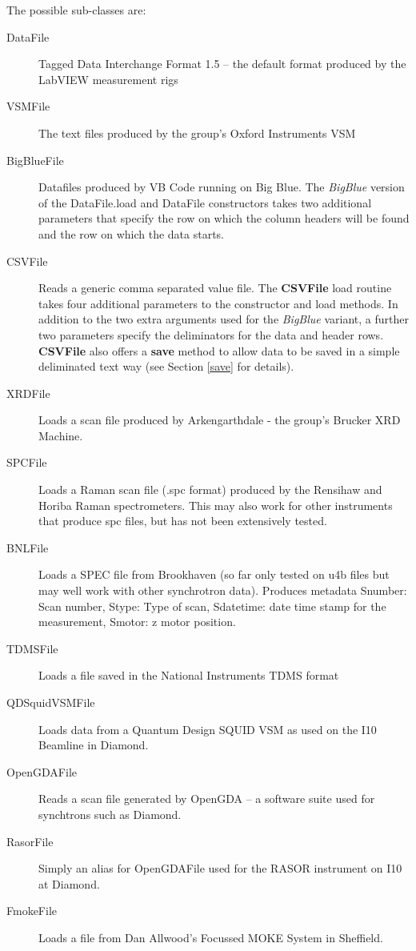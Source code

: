 \documentclass[a4paper,11pt]{scrartcl}
\begin{document}

The possible sub-classes are:
\begin{description}
\item[DataFile] Tagged Data Interchange Format 1.5 -- the default format produced by
the LabVIEW measurement rigs
\item[VSMFile] The text files produced by the group's Oxford Instruments VSM
\item[BigBlueFile] Datafiles produced by VB Code running on Big Blue. The
\textit{BigBlue} version of the DataFile.load and DataFile constructors takes
two additional parameters that specify the row on which the column headers will
be found and the row on which the data starts.
\item[CSVFile] Reads a generic comma separated value file. The \textbf{CSVFile} load
routine takes four additional parameters to the constructor and load methods. In
addition to the two extra arguments used for the \textit{BigBlue} variant, a
further two parameters specify the deliminators for the data and header rows. \textbf{CSVFile} also offers a \textbf{save} method to allow data to be saved in a simple deliminated text way (see Section \ref{save} for details).
\item[XRDFile] Loads a scan file produced by Arkengarthdale - the group's Brucker
XRD Machine.
\item[SPCFile] Loads a Raman scan file (.spc format) produced by the Rensihaw and Horiba
Raman spectrometers. This may also work for other instruments that produce spc files, but has not been extensively tested.
\item[BNLFile] Loads a SPEC file from Brookhaven (so far only tested on u4b files but may well work with other synchrotron data). Produces metadata Snumber: Scan number, Stype: Type of scan, Sdatetime: date time stamp for the measurement, Smotor: z motor position.
\item[TDMSFile] Loads a file saved in the National Instruments TDMS format
\item [QDSquidVSMFile] Loads data from a Quantum Design SQUID VSM as used on the I10 Beamline in Diamond.
\item [OpenGDAFile] Reads a scan file generated by OpenGDA -- a software suite used for synchtrons such as Diamond.
\item [RasorFile] Simply an alias for OpenGDAFile used for the RASOR instrument on I10 at Diamond.
\item [FmokeFile] Loads a file from Dan Allwood's Focussed MOKE System in Sheffield.
\end{description}
\end{document}
